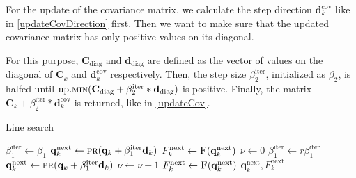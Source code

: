 For the update of the covariance matrix, we calculate the step direction $\mathbf{d}^\mathrm{cov}_k$ like in \ref{updateCovDirection} first. Then we want to make sure that the updated covariance matrix has only positive values on its diagonal.

For this purpose, $\mathbf{C}_\mathrm{diag}$ and $\mathbf{d}_\mathrm{diag}$ are defined as the vector of values on the diagonal of $\mathbf{C}_k$ and $\mathbf{d}^\mathrm{cov}_k$ respectively. Then, the step size $\beta^\mathrm{iter}_2$, initialized as $\beta_2$, is halfed until $\mathrm{np.}\Call{min}{\mathbf{C}_\mathrm{diag}+\beta^\mathrm{iter}_2*\mathbf{d}_\mathrm{diag}}$ is positive. Finally, the matrix $\mathbf{C}_k+\beta^\mathrm{iter}_2*\mathbf{d}^\mathrm{cov}_k$ is returned, like in \eqref{updateCov}.

\begin{algorithm}[H]%
\caption{\label{LineSearchAlg}Line search}
\begin{algorithmic}[1]
\State $\beta^\mathrm{iter}_1 \gets \beta_1$
\State $\mathbf{q}^\mathrm{next}_k \gets \Call{pr}{\mathbf{q}_k+\beta^\mathrm{iter}_1\mathbf{d}_k}$
\State $F^\mathrm{next}_k \gets \Call{F}{\mathbf{q}^\mathrm{next}_k}$
\State $\nu \gets 0$
\State $\beta^\mathrm{iter}_1 \gets r\beta^\mathrm{iter}_1$
\State $\mathbf{q}^\mathrm{next}_k \gets \Call{pr}{\mathbf{q}_k+\beta^\mathrm{iter}_1\mathbf{d}_k}$
\State $\nu \gets \nu+1$
\State $F^\mathrm{next}_k \gets \Call{F}{\mathbf{q}^\mathrm{next}_k}$
\EndWhile
\Return $\mathbf{q}^\mathrm{next}_k, F^\mathrm{next}_k$
\EndFunction
\end{algorithmic}
\end{algorithm}

